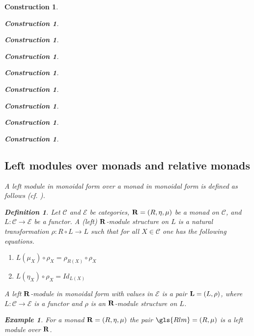 \documentclass[onecolumn,12pt]{amsart}
\newtheorem{definition}[proposition]{Definition}
\newtheorem{example}[proposition]{Example}
\numberwithin{proposition}{subsection}
\newtheorem{construction}[proposition]{Construction}
\newcommand{\sr}{\rightarrow}
\newcommand{\R}{{\bf R}}
\newcommand{\C}{{\mathcal C}}
\newcommand{\E}{{\mathcal E}}
\begin{document}
\begin{construction}
\begin{construction}
\begin{construction}
\begin{construction}
\begin{construction}
\begin{construction}
\begin{construction}
\begin{construction}
\begin{construction}
\subsection{Left modules over monads and relative monads}

%
A left module in monoidal form over a monad in monoidal form is defined as follows (cf.{} \cite[p.~222]{HM2007}). 
%
\begin{definition}
\label{2017.04.01.def2} 
Let $\C$ and $\E$ be categories, $\R=(R,\eta,\mu)$ be a
monad on $\C$, and $L:\C\sr \E$ be a functor. A {\em (left) $\R$-module structure} on
$L$ is a natural transformation $\rho:R\circ L\sr L$ such that for all $X\in\C$
one has the following equations.
%
\begin{enumerate}
\item $L(\mu_X)\circ \rho_X=\rho_{R(X)}\circ \rho_X$
\item $L(\eta_X)\circ \rho_X=Id_{L(X)}$
\end{enumerate}
%
A left $\R$-module in monoidal form with values in $\E$ is a pair 
${\bf L}=(L,\rho)$, where $L:\C\sr \E$ is a functor and $\rho$ is an $\R$-module
structure on $L$.
\end{definition}
%
\begin{example}\label{2017.04.15.ex1}\rm
For a monad $\R=(R,\eta,\mu)$ the pair $\gls{Rlm}=(R,\mu)$ is a left module over $\R$.
\end{example}
%


\end{construction}
\end{construction}
\end{construction}
\end{construction}
\end{construction}
\end{construction}
\end{construction}
\end{construction}
\end{construction}
\end{document}
